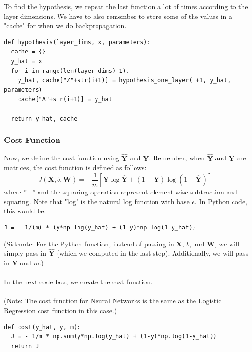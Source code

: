 \documentclass{article}
\begin{document}
To find the hypothesis, we repeat the last function a lot of times according to the layer dimensions. We have to also remember to store some of the values in a "cache" for when we do backpropagation.

\begin{lstlisting}
def hypothesis(layer_dims, x, parameters):
  cache = {}
  y_hat = x
  for i in range(len(layer_dims)-1):
    y_hat, cache["Z"+str(i+1)] = hypothesis_one_layer(i+1, y_hat, parameters)
    cache["A"+str(i+1)] = y_hat
  
  return y_hat, cache
\end{lstlisting}

\subsubsection{Cost Function}
Now, we define the cost function using $\hat{\textbf{Y}}$ and $\textbf{Y}$. Remember, when $\hat{\textbf{Y}}$ and $\textbf{Y}$ are matrices, the cost function is defined as follows:
$$J(\textbf{X},b,\textbf{W})=-\frac{1}{m}\left[\textbf{Y}\log{\hat{\textbf{Y}}}+(1-\textbf{Y})\log{(1-\hat{\textbf{Y}})}\right],$$
where ''$-$'' and the squaring operation represent element-wise subtraction and squaring. Note that "log" is the natural log function with base $e$. In Python code, this would be:
\begin{lstlisting}
J = - 1/(m) * (y*np.log(y_hat) + (1-y)*np.log(1-y_hat))
\end{lstlisting}
(Sidenote: For the Python function, instead of passing in $\textbf{X}$, $b$, and $\textbf{W}$, we will simply pass in $\hat{\textbf{Y}}$ (which we computed in the last step). Additionally, we will pass in $\textbf{Y}$ and $m$.) 
\\
\\
In the next code box, we create the cost function.
\\
\\
(Note: The cost function for Neural Networks is the same as the Logistic Regression cost function in this case.)
\begin{lstlisting}
def cost(y_hat, y, m):
  J = - 1/m * np.sum(y*np.log(y_hat) + (1-y)*np.log(1-y_hat))
  return J
\end{lstlisting}
\end{document}
